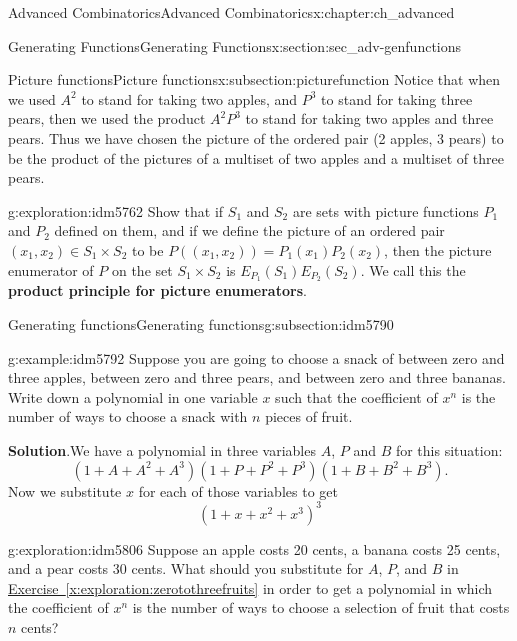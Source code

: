 \documentclass[oneside,10pt,]{book}
\newcommand{\terminology}[1]{\textbf{#1}}
\numberwithin{equation}{chapter}
\begin{document}
\begin{chapterptx}{Advanced Combinatorics}{}{Advanced Combinatorics}{}{}{x:chapter:ch_advanced}
\begin{sectionptx}{Generating Functions}{}{Generating Functions}{}{}{x:section:sec_adv-genfunctions}
\begin{subsectionptx}{Picture functions}{}{Picture functions}{}{}{x:subsection:picturefunction}
Notice that when we used \(A^2\) to stand for taking two apples, and \(P^3\) to stand for taking three pears, then we used the product \(A^2P^3\) to stand for taking two apples and three pears. Thus we have chosen the picture of the ordered pair (2 apples, 3 pears) to be the product of the pictures of a multiset of two apples and a multiset of three pears.%
\begin{exploration}{}{g:exploration:idm5762}%
Show that if \(S_1\) and \(S_2\) are sets with picture functions \(P_1\) and \(P_2\) defined on them, and if we define the picture of an ordered pair \((x_1,x_2)\in S_1\times S_2\) to be \(P((x_1,x_2))= P_1(x_1)P_2(x_2)\), then the picture enumerator of \(P\) on the set \(S_1\times S_2\) is \(E_{P_1}(S_1)E_{P_2}(S_2)\). We call this the \terminology{product principle for picture enumerators}.%
\end{exploration}
\end{subsectionptx}
%
%
\typeout{************************************************}
\typeout{************************************************}
%
\begin{subsectionptx}{Generating functions}{}{Generating functions}{}{}{g:subsection:idm5790}
\begin{example}{}{g:example:idm5792}%
Suppose you are going to choose a snack of between zero and three apples, between zero and three pears, and between zero and three bananas. Write down a polynomial in one variable \(x\) such that the coefficient of \(x^n\) is the number of ways to choose a snack with \(n\) pieces of fruit.%
\par\smallskip%
\noindent\textbf{Solution}.\hypertarget{g:solution:idm5798}{}\quad{}We have a polynomial in three variables \(A\), \(P\) and \(B\) for this situation:%
\begin{equation*}
(1+A +A^2 +A^3)(1+P+P^2+P^3)(1+B+B^2+B^3)\text{.}
\end{equation*}
Now we substitute \(x\) for each of those variables to get%
\begin{equation*}
(1+x+x^2+x^3)^3
\end{equation*}
%
\end{example}
\begin{exploration}{}{g:exploration:idm5806}%
Suppose an apple costs 20 cents, a banana costs 25 cents, and a pear costs 30 cents. What should you substitute for \(A\), \(P\), and \(B\) in \hyperref[x:exploration:zerotothreefruits]{Exercise~\ref{x:exploration:zerotothreefruits}} in order to get a polynomial in which the coefficient of \(x^n\) is the number of ways to choose a selection of fruit that costs \(n\) cents?%

\end{exploration}
\end{subsectionptx}
\end{sectionptx}
\end{chapterptx}
\end{document}

